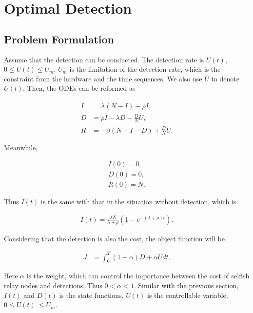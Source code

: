 \section{Optimal Detection}
\label{opt_detect}
\subsection{Problem Formulation}
Assume that the detection can be conducted.
The detection rate is $U(t)$, $0 \le U(t) \le U_{m}$.
$U_{m}$ is the limitation of the detection rate, which is the constraint from the hardware and the time sequences.
We also use $\dot{U}$ to denote $U(t)$.
Then, the ODEs can be reformed as
\begin{small}
\begin{equation}
\label{eq:SIM_t}
\begin{aligned}
\dot{I} &= \lambda (N-I) - \rho I, \\
\dot{D} &= \rho I  - \lambda D - \frac{D}{N} U,\\
\dot{R} &= - \beta (N-I-D) + \frac{D}{N} U.
\end{aligned}
\end{equation}
\end{small}
Meanwhile,
\begin{small}
\begin{equation}
\label{eq:SIM_0}
\begin{aligned}
I(0)=0,\\
D(0)=0,\\
R(0)=N.
\end{aligned}
\end{equation}
\end{small}

Thus $I(t)$ is the same with that in the situation without detection, which is
\begin{small}
\begin{equation}
\label{eq:I}
\begin{aligned}
I(t) = \frac{ \lambda N }{ \lambda + \rho }(1- e^{-(\lambda + \rho)t}).
\end{aligned}
\end{equation}
\end{small}

Considering that the detection is also the cost,
the object function will be
\begin{small}
\begin{equation}
\nonumber
\begin{aligned}
J &= \int_{0}^{T} (1-\alpha) D + \alpha U dt.
\end{aligned}
\end{equation}
\end{small}
Here $\alpha$ is the weight, which can control the importance
between the cost of selfish relay nodes
and detections.
Thus $0 < \alpha < 1$.
Similar with the previous section,
$I(t)$ and $D(t)$ is the state functions.
$U(t)$ is the controllable variable, $0 \le U(t)\ \le U_{m}$.

